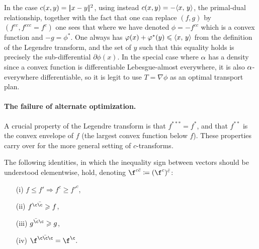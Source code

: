 \begin{rem}\label{rem-proof-brenier}
	In the case $c(x,y)=|\!| x-y |\!|^2$, using instead $c(x,y)=-\langle x,\,y\rangle$, the primal-dual relationship, together with the fact that one can replace $(f,g)$ by $(f^{cc},f^{ccc}=f^c)$ one sees that 
	where we have denoted $\phi=-f^{cc}$ which is a convex function and $-g=\phi^*$. 
	One always has $\varphi(x)+\varphi^*(y) \leqslant \langle x,\,y\rangle$ from the definition of the Legendre transform, and the set of $y$ such that this equality holds is precisely the sub-differential $\partial\phi(x)$.
	In the special case where $\alpha$ has a density since a convex function is differentiable Lebesgue-almost everywhere, it is also $\alpha$-everywhere differentiable, so it is legit to use $T=\nabla\phi$ as an optimal transport plan.
\end{rem}



\paragraph{The failure of alternate optimization.}

A crucial property of the Legendre transform is that $f^{***}=f^*$, and that $f^{**}$ is the convex envelope of $f$ (the largest convex function below $f$). These properties carry over for the more general setting of $c$-transforms.

\begin{prop}
The following identities, in which the inequality sign between vectors should be understood elementwise, hold, denoting $\f^{c\bar c} \eqdef (\f^{c})^{\bar c}$:
	\begin{itemize}
	\item[(i)] $f \leq f' \Rightarrow f^{c}\geq f'^{c}$, 
	\item[(ii)] $f^{\c\bar{\c}} \geq f$, 
	\item [(iii)] $g^{\bar{\c}\c} \geq g$, 
	\item[(iv)] $\f^{\c\bar{\c}\c}=\f^{\c}.$
	\end{itemize}	
\end{prop}

